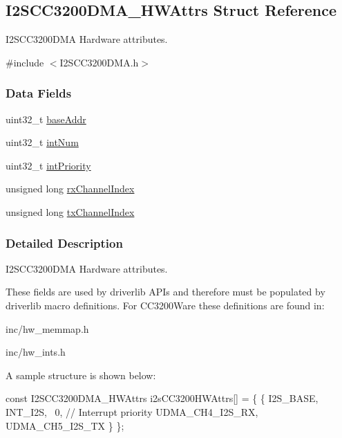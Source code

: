 \subsection{I2\+S\+C\+C3200\+D\+M\+A\+\_\+\+H\+W\+Attrs Struct Reference}
\label{struct_i2_s_c_c3200_d_m_a___h_w_attrs}


I2\+S\+C\+C3200\+D\+M\+A Hardware attributes.  




{\ttfamily \#include $<$I2\+S\+C\+C3200\+D\+M\+A.\+h$>$}

\subsubsection*{Data Fields}
\begin{DoxyCompactItemize}
\item 
uint32\+\_\+t \hyperlink{struct_i2_s_c_c3200_d_m_a___h_w_attrs_a5c7118ba39df294292416db655a444b2}{base\+Addr}
\item 
uint32\+\_\+t \hyperlink{struct_i2_s_c_c3200_d_m_a___h_w_attrs_a8f6a7b4b483c5722b4f7a9c6ff345336}{int\+Num}
\item 
uint32\+\_\+t \hyperlink{struct_i2_s_c_c3200_d_m_a___h_w_attrs_a05e33796bd29a7e691915ef3f662b2ec}{int\+Priority}
\item 
unsigned long \hyperlink{struct_i2_s_c_c3200_d_m_a___h_w_attrs_ab2ce6b73e9391305baae269289262afa}{rx\+Channel\+Index}
\item 
unsigned long \hyperlink{struct_i2_s_c_c3200_d_m_a___h_w_attrs_a34608d4786f5b013412cfe07a6f17330}{tx\+Channel\+Index}
\end{DoxyCompactItemize}


\subsubsection{Detailed Description}
I2\+S\+C\+C3200\+D\+M\+A Hardware attributes. 

These fields are used by driverlib A\+P\+Is and therefore must be populated by driverlib macro definitions. For C\+C3200\+Ware these definitions are found in\+:
\begin{DoxyItemize}
\item inc/hw\+\_\+memmap.\+h
\item inc/hw\+\_\+ints.\+h
\end{DoxyItemize}

A sample structure is shown below\+: 
\begin{DoxyCode}
\textcolor{keyword}{const} I2SCC3200DMA_HWAttrs i2sCC3200HWAttrs[] = \{
    \{
        I2S\_BASE,
        INT\_I2S,
        ~0,                 \textcolor{comment}{// Interrupt priority}
        UDMA\_CH4\_I2S\_RX,
        UDMA\_CH5\_I2S\_TX
    \}
\};
\end{DoxyCode}
 

